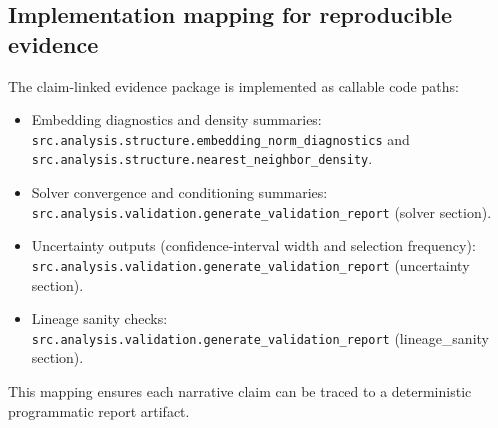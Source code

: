 \subsection{Implementation mapping for reproducible evidence}
The claim-linked evidence package is implemented as callable code paths:
\begin{itemize}
    \item Embedding diagnostics and density summaries: \texttt{src.analysis.structure.embedding\_norm\_diagnostics} and \texttt{src.analysis.structure.nearest\_neighbor\_density}.
    \item Solver convergence and conditioning summaries: \texttt{src.analysis.validation.generate\_validation\_report} (solver section).
    \item Uncertainty outputs (confidence-interval width and selection frequency): \texttt{src.analysis.validation.generate\_validation\_report} (uncertainty section).
    \item Lineage sanity checks: \texttt{src.analysis.validation.generate\_validation\_report} (lineage\_sanity section).
\end{itemize}
This mapping ensures each narrative claim can be traced to a deterministic programmatic report artifact.
